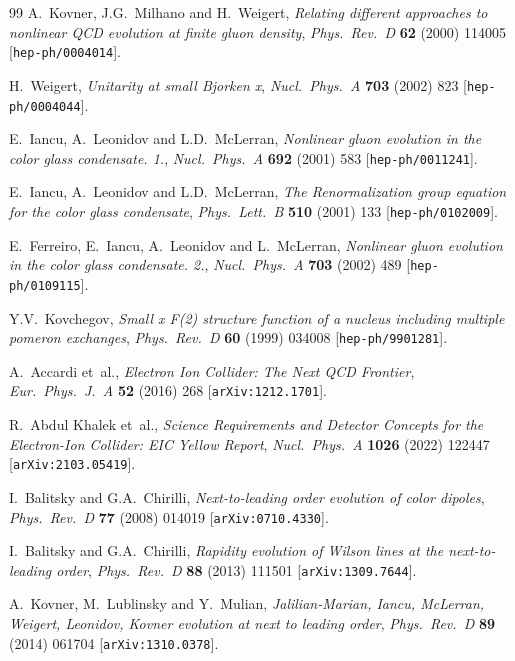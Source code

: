 \documentclass[11pt,a4paper]{article}
\numberwithin{equation}{section}
\begin{document}
\begin{thebibliography}{99}
A.~Kovner, J.G.~Milhano and H.~Weigert, \emph{Relating different approaches to nonlinear QCD
evolution at finite gluon density}, \emph{Phys.\ Rev.\ D} {\bf 62} (2000) 114005
[\texttt{hep-ph/0004014}].

H.~Weigert, \emph{Unitarity at small Bjorken x}, \emph{Nucl.\ Phys.\ A} {\bf 703} (2002) 823
[\texttt{hep-ph/0004044}].

E.~Iancu, A.~Leonidov and L.D.~McLerran, \emph{Nonlinear gluon evolution in the color glass
condensate. 1.}, \emph{Nucl.\ Phys.\ A} {\bf 692} (2001) 583 [\texttt{hep-ph/0011241}].

E.~Iancu, A.~Leonidov and L.D.~McLerran, \emph{The Renormalization group equation for the
color glass condensate}, \emph{Phys.\ Lett.\ B} {\bf 510} (2001) 133
[\texttt{hep-ph/0102009}].

E.~Ferreiro, E.~Iancu, A.~Leonidov and L.~McLerran, \emph{Nonlinear gluon evolution in the
color glass condensate. 2.}, \emph{Nucl.\ Phys.\ A} {\bf 703} (2002) 489
[\texttt{hep-ph/0109115}].

Y.V.~Kovchegov, \emph{Small x F(2) structure function of a nucleus including multiple pomeron
exchanges}, \emph{Phys.\ Rev.\ D} {\bf 60} (1999) 034008 [\texttt{hep-ph/9901281}].

A.~Accardi et~al., \emph{Electron Ion Collider: The Next QCD Frontier}, \emph{Eur.\ Phys.\
J.\ A} {\bf 52} (2016) 268 [\texttt{arXiv:1212.1701}].

R.~Abdul Khalek et~al., \emph{Science Requirements and Detector Concepts for the Electron-Ion
Collider: EIC Yellow Report}, \emph{Nucl.\ Phys.\ A} {\bf 1026} (2022) 122447
[\texttt{arXiv:2103.05419}].

I.~Balitsky and G.A.~Chirilli, \emph{Next-to-leading order evolution of color dipoles},
\emph{Phys.\ Rev.\ D} {\bf 77} (2008) 014019 [\texttt{arXiv:0710.4330}].

I.~Balitsky and G.A.~Chirilli, \emph{Rapidity evolution of Wilson lines at the next-to-leading
order}, \emph{Phys.\ Rev.\ D} {\bf 88} (2013) 111501 [\texttt{arXiv:1309.7644}].

A.~Kovner, M.~Lublinsky and Y.~Mulian, \emph{Jalilian-Marian, Iancu, McLerran, Weigert,
Leonidov, Kovner evolution at next to leading order}, \emph{Phys.\ Rev.\ D} {\bf 89} (2014)
061704 [\texttt{arXiv:1310.0378}].


\end{thebibliography}
\end{document}
